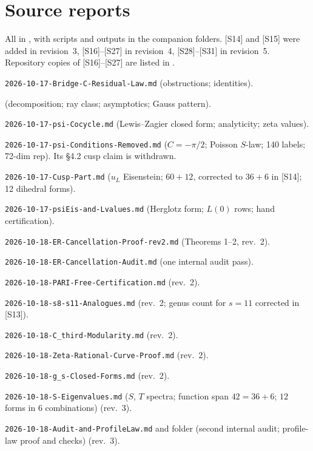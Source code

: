 \documentclass[11pt]{article}
\theoremstyle{definition}
\begin{document}
\section*{Source reports}\label{sec:sources}
All in , with scripts and outputs in the companion folders. [S14] and [S15] were added in revision~3,
[S16]--[S27] in revision~4, [S28]--[S31] in revision~5. Repository copies of [S16]--[S27] are listed in .
\begin{enumerate}[label={[S\arabic*]},leftmargin=3em]
\item \texttt{2026-10-17-Bridge-C-Residual-Law.md} (obstructions; identities).
\item {} (decomposition; ray class; asymptotics; Gauss pattern).
\item \texttt{2026-10-17-psi-Cocycle.md} (Lewis--Zagier closed form; analyticity; zeta values).
\item \texttt{2026-10-17-psi-Conditions-Removed.md} ($C=-\pi/2$; Poisson $S$-law; 140 labels; 72-dim rep). Its \S4.2 cusp claim is withdrawn.
\item \texttt{2026-10-17-Cusp-Part.md} ($u_L$ Eisenstein; $60+12$, corrected to $36+6$ in [S14]; 12 dihedral forms).
\item \texttt{2026-10-17-psiEis-and-Lvalues.md} (Herglotz form; $L(0)$ rows; hand certification).
\item \texttt{2026-10-18-ER-Cancellation-Proof-rev2.md} (Theorems 1--2, rev.~2).
\item \texttt{2026-10-18-ER-Cancellation-Audit.md} (one internal audit pass).
\item \texttt{2026-10-18-PARI-Free-Certification.md} (rev.~2).
\item \texttt{2026-10-18-s8-s11-Analogues.md} (rev.~2; genus count for $s=11$ corrected in [S13]).
\item \texttt{2026-10-18-C\_third-Modularity.md} (rev.~2).
\item \texttt{2026-10-18-Zeta-Rational-Curve-Proof.md} (rev.~2).
\item \texttt{2026-10-18-g\_s-Closed-Forms.md} (rev.~2).
\item \texttt{2026-10-18-S-Eigenvalues.md} ($S$, $T$ spectra; function span $42=36+6$; $12$ forms in $6$ combinations) (rev.~3).
\item \texttt{2026-10-18-Audit-and-ProfileLaw.md} and folder  (second internal audit; profile-law proof and checks) (rev.~3).

\end{enumerate}
\end{document}
